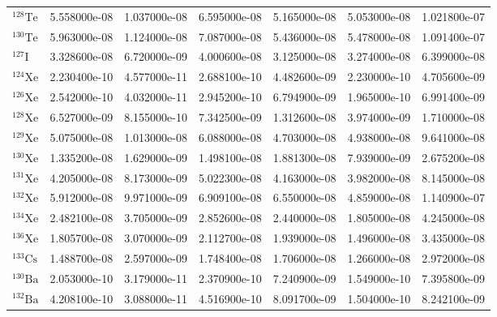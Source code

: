 \begin{tabular}{lrrrrrr}
$^{128}\mathrm{Te}$ &       5.558000e-08 &      1.037000e-08 &      6.595000e-08 &       5.165000e-08 &      5.053000e-08 &      1.021800e-07 \\
$^{130}\mathrm{Te}$ &       5.963000e-08 &      1.124000e-08 &      7.087000e-08 &       5.436000e-08 &      5.478000e-08 &      1.091400e-07 \\
$^{127}\mathrm{I}$  &       3.328600e-08 &      6.720000e-09 &      4.000600e-08 &       3.125000e-08 &      3.274000e-08 &      6.399000e-08 \\
$^{124}\mathrm{Xe}$ &       2.230400e-10 &      4.577000e-11 &      2.688100e-10 &       4.482600e-09 &      2.230000e-10 &      4.705600e-09 \\
$^{126}\mathrm{Xe}$ &       2.542000e-10 &      4.032000e-11 &      2.945200e-10 &       6.794900e-09 &      1.965000e-10 &      6.991400e-09 \\
$^{128}\mathrm{Xe}$ &       6.527000e-09 &      8.155000e-10 &      7.342500e-09 &       1.312600e-08 &      3.974000e-09 &      1.710000e-08 \\
$^{129}\mathrm{Xe}$ &       5.075000e-08 &      1.013000e-08 &      6.088000e-08 &       4.703000e-08 &      4.938000e-08 &      9.641000e-08 \\
$^{130}\mathrm{Xe}$ &       1.335200e-08 &      1.629000e-09 &      1.498100e-08 &       1.881300e-08 &      7.939000e-09 &      2.675200e-08 \\
$^{131}\mathrm{Xe}$ &       4.205000e-08 &      8.173000e-09 &      5.022300e-08 &       4.163000e-08 &      3.982000e-08 &      8.145000e-08 \\
$^{132}\mathrm{Xe}$ &       5.912000e-08 &      9.971000e-09 &      6.909100e-08 &       6.550000e-08 &      4.859000e-08 &      1.140900e-07 \\
$^{134}\mathrm{Xe}$ &       2.482100e-08 &      3.705000e-09 &      2.852600e-08 &       2.440000e-08 &      1.805000e-08 &      4.245000e-08 \\
$^{136}\mathrm{Xe}$ &       1.805700e-08 &      3.070000e-09 &      2.112700e-08 &       1.939000e-08 &      1.496000e-08 &      3.435000e-08 \\
$^{133}\mathrm{Cs}$ &       1.488700e-08 &      2.597000e-09 &      1.748400e-08 &       1.706000e-08 &      1.266000e-08 &      2.972000e-08 \\
$^{130}\mathrm{Ba}$ &       2.053000e-10 &      3.179000e-11 &      2.370900e-10 &       7.240900e-09 &      1.549000e-10 &      7.395800e-09 \\
$^{132}\mathrm{Ba}$ &       4.208100e-10 &      3.088000e-11 &      4.516900e-10 &       8.091700e-09 &      1.504000e-10 &      8.242100e-09 \\

\end{tabular}
